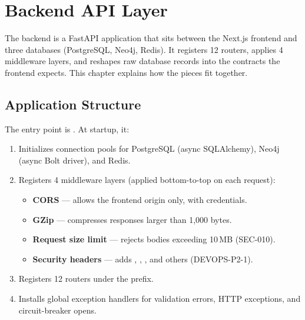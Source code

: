 \chapter{Backend API Layer}
\label{ch:backend-api}

The backend is a FastAPI application that sits between the Next.js frontend
and three databases (PostgreSQL, Neo4j, Redis).  It registers 12 routers,
applies 4 middleware layers, and reshapes raw database records into the
contracts the frontend expects.  This chapter explains how the pieces
fit together.


\section{Application Structure}
\label{sec:api-structure}

The entry point is .  At startup, it:

\begin{enumerate}
    \item Initializes connection pools for PostgreSQL (async SQLAlchemy),
          Neo4j (async Bolt driver), and Redis.
    \item Registers 4 middleware layers (applied bottom-to-top on each
          request):
          \begin{itemize}
              \item \textbf{CORS} --- allows the frontend origin only, with
                    credentials.
              \item \textbf{GZip} --- compresses responses larger than
                    1,000 bytes.
              \item \textbf{Request size limit} --- rejects bodies exceeding
                    10\,MB (SEC-010).
              \item \textbf{Security headers} --- adds
                    ,
                    ,
                    , and others
                    (DEVOPS-P2-1).
          \end{itemize}
    \item Registers 12 routers under the  prefix.
    \item Installs global exception handlers for validation errors,
          HTTP exceptions, and circuit-breaker opens.
\end{enumerate}


